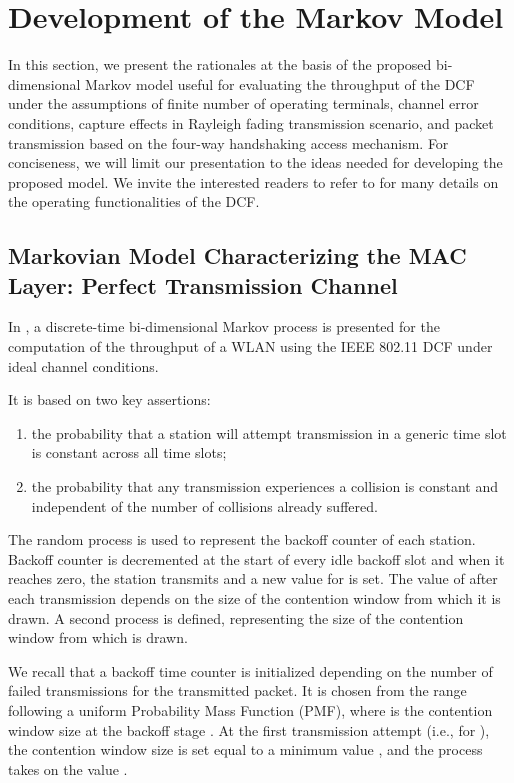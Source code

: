 \documentclass[10pt,onecolumn,a4paper]{IEEEtran}
\begin{document}
\section{Development of the Markov Model}
In this section, we present the rationales at the basis of the
proposed bi-dimensional Markov model useful for evaluating the
throughput of the DCF under the assumptions of finite number of
operating terminals, channel error conditions, capture effects in
Rayleigh fading transmission scenario, and packet transmission
based on the four-way handshaking access mechanism. For
conciseness, we will limit our presentation to the ideas needed
for developing the proposed model.
We invite the interested readers to refer to
\cite{standard_DCF_MAC,Bianchi} for many details on the operating
functionalities of the DCF.
\subsection{Markovian Model Characterizing the MAC Layer: Perfect Transmission Channel}
In \cite{Bianchi}, a discrete-time bi-dimensional Markov process
 is presented for the computation of the throughput
of a WLAN using the IEEE 802.11 DCF under ideal channel
conditions.

It is based on two key assertions:
\begin{enumerate}
\item the probability  that a station will attempt
transmission in a generic time slot is constant across all time
slots;
\item the probability  that any transmission experiences
a collision is constant and independent of the number of
collisions already suffered.
\end{enumerate}
The random process  is used to represent the backoff
counter of each station. Backoff counter is decremented at the
start of every idle backoff slot and when it reaches zero, the
station transmits and a new value for  is set. The value of
 after each transmission depends on the size of the
contention window from which it is drawn.
A second process  is defined, representing the size of the
contention window  from which  is
drawn.

We recall that a backoff time counter is initialized depending on the
number of failed transmissions for the transmitted packet. It is
chosen from the range  following a uniform Probability
Mass Function (PMF), where  is the contention window size at the
backoff stage . At the first transmission attempt (i.e., for
), the contention window size is set equal to a minimum value
, and the process  takes on the value .
\end{document}

